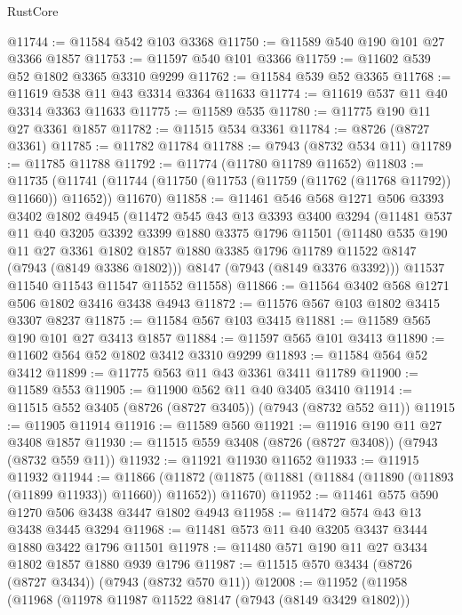 \begin{lexlean}{RustCore}
\begin{coremodule}
@11744 := @11584 @542 @103 @3368
@11750 := @11589 @540 @190 @101 @27 @3366 @1857
@11753 := @11597 @540 @101 @3366
@11759 := @11602 @539 @52 @1802 @3365 @3310 @9299
@11762 := @11584 @539 @52 @3365
@11768 := @11619 @538 @11 @43 @3314 @3364 @11633
@11774 := @11619 @537 @11 @40 @3314 @3363 @11633
@11775 := @11589 @535
@11780 := @11775 @190 @11 @27 @3361 @1857
@11782 := @11515 @534 @3361
@11784 := @8726 (@8727 @3361)
@11785 := @11782 @11784
@11788 := @7943 (@8732 @534 @11)
@11789 := @11785 @11788
@11792 := @11774 (@11780 @11789 @11652)
@11803 := @11735
    (@11741 (@11744 (@11750 (@11753 (@11759 (@11762 (@11768 @11792)) @11660)) @11652)) @11670)
@11858 := @11461
    @546
    @568
    @1271
    @506
    @3393
    @3402
    @1802
    @4945
    (@11472
      @545
      @43
      @13
      @3393
      @3400
      @3294
      (@11481
        @537
        @11
        @40
        @3205
        @3392
        @3399
        @1880
        @3375
        @1796
        @11501
        (@11480
          @535
          @190
          @11
          @27
          @3361
          @1802
          @1857
          @1880
          @3385
          @1796
          @11789
          @11522
          @8147
          (@7943 (@8149 @3386 @1802)))
        @8147
        (@7943 (@8149 @3376 @3392)))
      @11537
      @11540
      @11543
      @11547
      @11552
      @11558)
@11866 := @11564 @3402 @568 @1271 @506 @1802 @3416 @3438 @4943
@11872 := @11576 @567 @103 @1802 @3415 @3307 @8237
@11875 := @11584 @567 @103 @3415
@11881 := @11589 @565 @190 @101 @27 @3413 @1857
@11884 := @11597 @565 @101 @3413
@11890 := @11602 @564 @52 @1802 @3412 @3310 @9299
@11893 := @11584 @564 @52 @3412
@11899 := @11775 @563 @11 @43 @3361 @3411 @11789
@11900 := @11589 @553
@11905 := @11900 @562 @11 @40 @3405 @3410
@11914 := @11515 @552 @3405 (@8726 (@8727 @3405)) (@7943 (@8732 @552 @11))
@11915 := @11905 @11914
@11916 := @11589 @560
@11921 := @11916 @190 @11 @27 @3408 @1857
@11930 := @11515 @559 @3408 (@8726 (@8727 @3408)) (@7943 (@8732 @559 @11))
@11932 := @11921 @11930 @11652
@11933 := @11915 @11932
@11944 := @11866
    (@11872 (@11875 (@11881 (@11884 (@11890 (@11893 (@11899 @11933)) @11660)) @11652)) @11670)
@11952 := @11461 @575 @590 @1270 @506 @3438 @3447 @1802 @4943
@11958 := @11472 @574 @43 @13 @3438 @3445 @3294
@11968 := @11481 @573 @11 @40 @3205 @3437 @3444 @1880 @3422 @1796 @11501
@11978 := @11480 @571 @190 @11 @27 @3434 @1802 @1857 @1880 @939 @1796
@11987 := @11515 @570 @3434 (@8726 (@8727 @3434)) (@7943 (@8732 @570 @11))
@12008 := @11952
    (@11958
      (@11968
        (@11978 @11987 @11522 @8147 (@7943 (@8149 @3429 @1802)))

\end{coremodule}
\end{lexlean}
